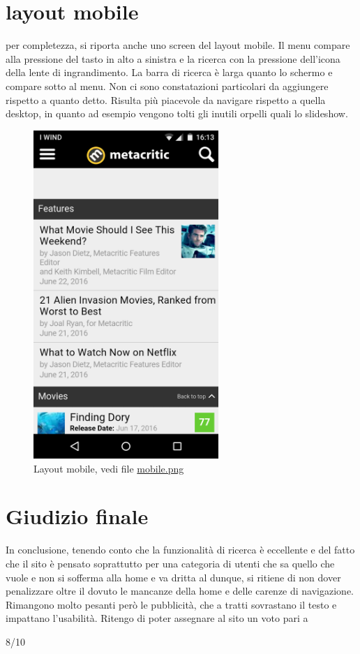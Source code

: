 \documentclass[12pt]{article}
\begin{document}
\section{layout mobile}
per completezza, si riporta anche uno screen del layout mobile. Il menu compare alla pressione del tasto in alto a sinistra e la ricerca con la pressione dell'icona della lente di ingrandimento.
La barra di ricerca è larga quanto lo schermo e compare sotto al menu. Non ci sono constatazioni particolari da aggiungere rispetto a quanto detto. Risulta più piacevole da navigare rispetto a quella desktop, in quanto ad esempio vengono tolti gli inutili orpelli quali lo slideshow.
\begin{figure}[H]
	\begin{center}
		\includegraphics[width=7cm]{mobile.png}
		\caption{Layout mobile, vedi file \href{mobile.png}{mobile.png}}
	\end{center}
\end{figure}
\section{Giudizio finale}
In conclusione, tenendo conto che la funzionalità di ricerca è eccellente e del fatto che il sito è pensato soprattutto per una categoria di utenti che sa quello che vuole e non si sofferma alla home e va dritta al dunque, si ritiene di non dover penalizzare oltre il dovuto le mancanze della home e delle carenze di navigazione. Rimangono molto pesanti però le pubblicità, che a tratti sovrastano il testo e impattano l'usabilità. Ritengo di poter assegnare al sito un voto pari a
	\begin{center}
		\huge 8/10
	\end{center}
	\newpage
\end{document}
